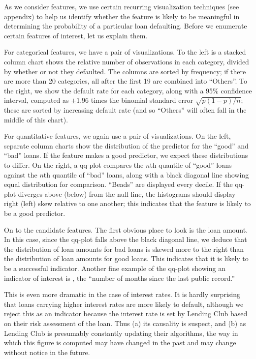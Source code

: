
As we consider features, we use certain recurring visualization techniques (see appendix) to help us identify whether the feature is likely to be meaningful in determining the probability of a particular loan defaulting. Before we enumerate certain features of interest, let us explain them.

For categorical features, we have a pair of visualizations. To the left is a stacked column chart shows the relative number of observations in each category, divided by whether or not they defaulted. The columns are sorted by frequency; if there are more than 20 categories, all after the first 19 are combined into ``Others''. To the right, we show the default rate for each category, along with a 95\% confidence interval, computed as $\pm 1.96$ times the binomial standard error $\sqrt{p(1-p)/n}$; these are sorted by increasing default rate (and so ``Others'' will often fall in the middle of this chart).

For quantitative features, we again use a pair of visualizations. On the left, separate column charts show the distribution of the predictor for the ``good'' and ``bad'' loans. If the feature makes a good predictor, we expect these distributions to differ. On the right, a qq-plot compares the $n$th quantile of ``good'' loans against the $n$th quantile of ``bad'' loans, along with a black diagonal line showing equal distribution for comparison. ``Beads'' are displayed every decile. If the qq-plot diverges above (below) from the null line, the histograms should display right (left) skew relative to one another; this indicates that the feature is likely to be a good predictor.

On to the candidate features. The first obvious place to look is the loan amount. In this case, since the qq-plot falls above the black diagonal line, we deduce that the distribution of loan amounts for bad loans is skewed more to the right than the distribution of loan amounts for good loans. This indicates that it is likely to be a successful indicator. Another fine example of the qq-plot showing an indicator of interest is , the ``number of months since the last public record.''

This is even more dramatic in the case of interest rates. It is hardly surprising that loans carrying higher interest rates are more likely to default, although we reject this as an indicator because the interest rate is set by Lending Club based on their risk assessment of the loan. Thus (a) its causality is suspect, and (b) as Lending Club is presumably constantly updating their algorithms, the way in which this figure is computed may have changed in the past and may change without notice in the future.

